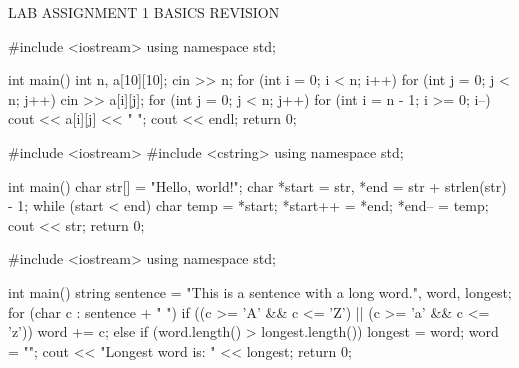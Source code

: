
\assignmenttitle
    {LAB ASSIGNMENT 1}
    {BASICS REVISION}


\programs


\codelabel

\begin{code}
#include <iostream>
using namespace std;

int main() {
    int n, a[10][10];
    cin >> n;
    for (int i = 0; i < n; i++)
        for (int j = 0; j < n; j++) {cin >> a[i][j]};
    for (int j = 0; j < n; j++) {
        for (int i = n - 1; i >= 0; i--) {cout << a[i][j] << " "};
        cout << endl;
    }
    return 0;
}
\end{code}

\outputlabel
{}


\codelabel

\begin{code}
#include <iostream>
#include <cstring>
using namespace std;

int main() {
    char str[] = "Hello, world!";
    char *start = str, *end = str + strlen(str) - 1;
    while (start < end) {
        char temp = *start;
        *start++ = *end;
        *end-- = temp;
    }
    cout << str;
    return 0;
}
\end{code}

\outputlabel
{}


\codelabel

\begin{code}
#include <iostream>
using namespace std;

int main() {
    string sentence = "This is a sentence with a long word.", word, longest;
    for (char c : sentence + " ") {
        if ((c >= 'A' && c <= 'Z') || (c >= 'a' && c <= 'z')) {word += c};
        else {
            if (word.length() > longest.length()) {longest = word};
            word = "";
        }
    }
    cout << "Longest word is: " << longest;
    return 0;
}
\end{code}

\outputlabel
{}

